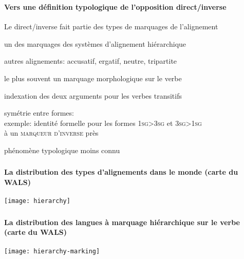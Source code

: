 \begin{frame}
\frametitle{}
\framesubtitle{Vers une définition typologique de l'opposition direct/inverse}
\begin{wideitemize}
\item Le direct/inverse fait partie des types de marquages de
  l'alignement
\begin{smallwideitemize}
\item un des marquages des systèmes d'alignement hiérarchique
\item autres alignements: accusatif, ergatif, neutre, tripartite
\pause
\item le plus souvent un marquage morphologique sur le verbe
\item indexation des deux arguments pour les verbes transitifs
\item symétrie entre formes:\\ exemple: identité formelle pour les formes \textsc{1sg>3sg} et
  \textsc{3sg>1sg}\\ à un \textsc{marqueur d'inverse} près
\pause
\item phénomène typologique moins connu
\item \cite{zuniga06}
\end{smallwideitemize}
\end{wideitemize}
\end{frame}


\begin{frame}
\frametitle{}
\framesubtitle{La distribution des types d'alignements 
  dans le monde (carte du WALS)}
\begin{center}
\vspace*{-.3cm}
\texttt{[image: hierarchy]}

\end{center}
\end{frame}


\begin{frame}
\frametitle{}
\framesubtitle{La distribution des langues à marquage hiérarchique
  sur le verbe (carte du WALS)}
\begin{center}
\vspace*{-.3cm}
\texttt{[image: hierarchy-marking]}

\end{center}
\end{frame}

